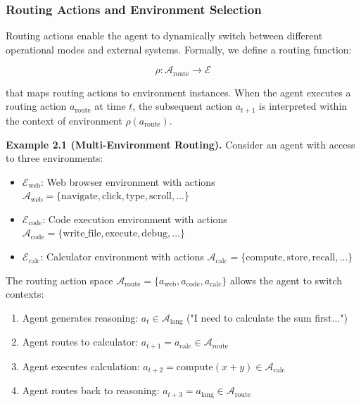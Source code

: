 \subsubsection{Routing Actions and Environment Selection}

Routing actions enable the agent to dynamically switch between different operational modes and external systems. Formally, we define a routing function:

$$\rho: \mathcal{A}_{\text{route}} \rightarrow \mathcal{E}$$

that maps routing actions to environment instances. When the agent executes a routing action $a_{\text{route}}$ at time $t$, the subsequent action $a_{t+1}$ is interpreted within the context of environment $\rho(a_{\text{route}})$.

\textbf{Example 2.1 (Multi-Environment Routing).} Consider an agent with access to three environments:
\begin{itemize}
    \item $\mathcal{E}_{\text{web}}$: Web browser environment with actions $\mathcal{A}_{\text{web}} = \{\text{navigate}, \text{click}, \text{type}, \text{scroll}, \ldots\}$
    \item $\mathcal{E}_{\text{code}}$: Code execution environment with actions $\mathcal{A}_{\text{code}} = \{\text{write\_file}, \text{execute}, \text{debug}, \ldots\}$
    \item $\mathcal{E}_{\text{calc}}$: Calculator environment with actions $\mathcal{A}_{\text{calc}} = \{\text{compute}, \text{store}, \text{recall}, \ldots\}$

\end{itemize}
The routing action space $\mathcal{A}_{\text{route}} = \{a_{\text{web}}, a_{\text{code}}, a_{\text{calc}}\}$ allows the agent to switch contexts:

\begin{enumerate}
    \item Agent generates reasoning: $a_t \in \mathcal{A}_{\text{lang}}$ ("I need to calculate the sum first...")
    \item Agent routes to calculator: $a_{t+1} = a_{\text{calc}} \in \mathcal{A}_{\text{route}}$
    \item Agent executes calculation: $a_{t+2} = \text{compute}(x + y) \in \mathcal{A}_{\text{calc}}$
    \item Agent routes back to reasoning: $a_{t+3} = a_{\text{lang}} \in \mathcal{A}_{\text{route}}$

\end{enumerate}
